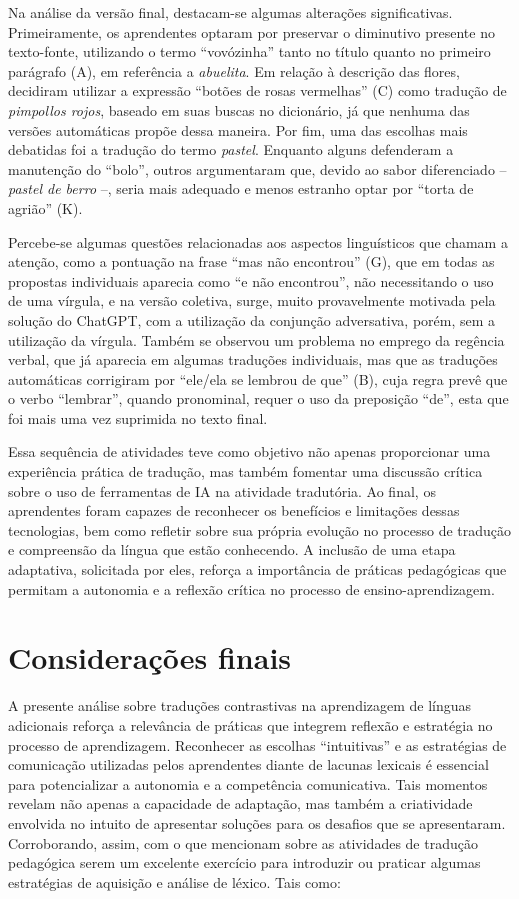 \documentclass[portuguese]{textolivre}
\begin{document}
Na análise da versão final, destacam-se algumas alterações significativas. Primeiramente, os aprendentes optaram por preservar o diminutivo presente no texto-fonte, utilizando o termo “vovózinha” tanto no título quanto no primeiro parágrafo (A), em referência a \textit{abuelita}. Em relação à descrição das flores, decidiram utilizar a expressão “botões de rosas vermelhas” (C) como tradução de \textit{pimpollos rojos}, baseado em suas buscas no dicionário, já que nenhuma das versões automáticas propõe dessa maneira. Por fim, uma das escolhas mais debatidas foi a tradução do termo \textit{pastel}. Enquanto alguns defenderam a manutenção do “bolo”, outros argumentaram que, devido ao sabor diferenciado – \textit{pastel de berro} –, seria mais adequado e menos estranho optar por “torta de agrião” (K).

Percebe-se algumas questões relacionadas aos aspectos linguísticos que chamam a atenção, como a pontuação na frase “mas não encontrou” (G), que em todas as propostas individuais aparecia como “e não encontrou”, não necessitando o uso de uma vírgula, e na versão coletiva, surge, muito provavelmente motivada pela solução do ChatGPT, com a utilização da conjunção adversativa, porém, sem a utilização da vírgula. Também se observou um problema no emprego da regência verbal, que já aparecia em algumas traduções individuais, mas que as traduções automáticas corrigiram por “ele/ela se lembrou de que” (B), cuja regra prevê que o verbo “lembrar”, quando pronominal, requer o uso da preposição “de”, esta que foi mais uma vez suprimida no texto final.

Essa sequência de atividades teve como objetivo não apenas proporcionar uma experiência prática de tradução, mas também fomentar uma discussão crítica sobre o uso de ferramentas de IA na atividade tradutória. Ao final, os aprendentes foram capazes de reconhecer os benefícios e limitações dessas tecnologias, bem como refletir sobre sua própria evolução no processo de tradução e compreensão da língua que estão conhecendo. A inclusão de uma etapa adaptativa, solicitada por eles, reforça a importância de práticas pedagógicas que permitam a autonomia e a reflexão crítica no processo de ensino-aprendizagem.

\section{Considerações finais}\label{sec-conclusao}
A presente análise sobre traduções contrastivas na aprendizagem de línguas adicionais reforça a relevância de práticas que integrem reflexão e estratégia no processo de aprendizagem. Reconhecer as escolhas “intuitivas” e as estratégias de comunicação utilizadas pelos aprendentes diante de lacunas lexicais é essencial para potencializar a autonomia e a competência comunicativa. Tais momentos revelam não apenas a capacidade de adaptação, mas também a criatividade envolvida no intuito de apresentar soluções para os desafios que se apresentaram. Corroborando, assim, com o que mencionam \textcite{alcarazo2014} sobre as atividades de tradução pedagógica serem um excelente exercício para introduzir ou praticar algumas estratégias de aquisição e análise de léxico. Tais como:
\end{document}
